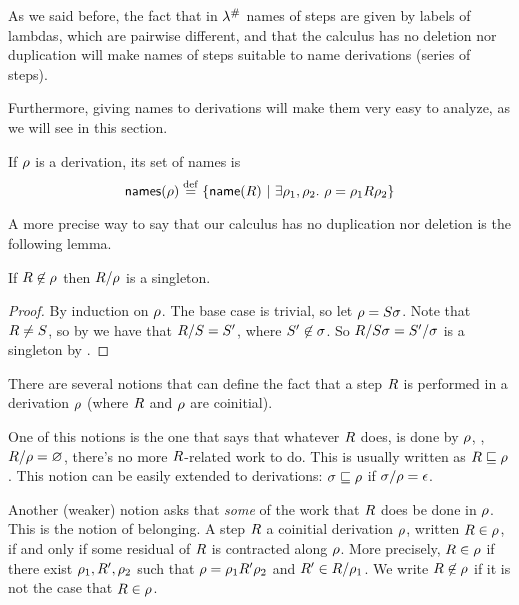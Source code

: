
As we said before, the fact that in $\lambda^{\mathtt{\#}}$ names of steps
are given by labels of lambdas, which are pairwise different,
and that the calculus has no deletion nor duplication will
make names of steps suitable to name derivations (\ie series of steps).

Furthermore, giving names to derivations will make them very easy to analyze, as we
will see in this section.

\begin{definition}
If $\rho$ is a derivation, its set of names is
\[
  \mathsf{names}(\rho) \overset{\mathrm{def}}{=} \{\mathsf{name}(R) \ |\  \exists \rho_1,\rho_2.\ \rho = \rho_1R\rho_2\}
\]
\end{definition}

A more precise way to say that our calculus has no duplication nor deletion is the following lemma.

\begin{lemma}[Permanence]
If $R \not\in \rho$ then $R/\rho$ is a singleton.
\end{lemma}
\begin{proof}
By induction on $\rho$. The base case is trivial, so let $\rho = S\sigma$. 
Note that $R \neq S$, so by 
we have that $R/S = S'$,
where $S' \not\in \sigma$.
So $R/S\sigma = S'/\sigma$ is a singleton by \ih.
\end{proof}

There are several notions that can define the fact that a step $R$ is performed in
a derivation $\rho$ (where $R$ and $\rho$ are coinitial).

One of this notions is the one that says that whatever $R$ does,
is done by $\rho$, \ie, $R / \rho = \varnothing$,
there's no more $R$-related work to do. This is usually written as
$R \sqsubseteq \rho$. This notion can be easily extended to derivations:
$\sigma \sqsubseteq \rho$ if $\sigma / \rho = \epsilon$.

Another (weaker) notion asks that \emph{some} of the work that $R$ does be
done in $\rho$. This is the notion of belonging.
A step $R$  a coinitial derivation $\rho$,
written $R \in \rho$,
if and only if some residual of $R$ is contracted along $\rho$. 
More precisely, $R \in \rho$ if there exist $\rho_1,R',\rho_2$
such that $\rho = \rho_1R'\rho_2$ and $R' \in R/\rho_1$.
We write $R \not\in \rho$ if it is not the case that $R \in \rho$.


